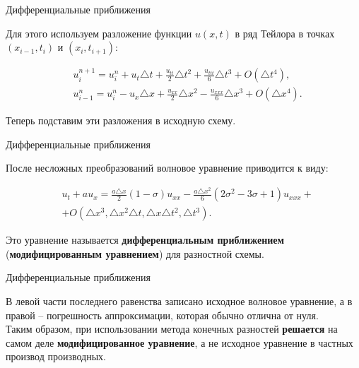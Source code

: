 \documentclass[10pt,xcolor=pst,aspectratio=169]{beamer}
\begin{document}
\begin{frame}{Дифференциальные приближения}

	\transdissolve[duration=0.1]
	\justifying
	\large

	Для   этого   используем   разложение функции $u(x,t)$ в ряд Тейлора в точках $(x_{i - 1}, t_{i})$ и $(x_{i}, t_{i + 1})$:

	\[
		\begin{split}
			&u^{n + 1}_{i} = u^{n}_{i} + u_{t} \triangle t + \frac{u_{tt}}{2} \triangle t^{2} + \frac{u_{ttt}}{6} \triangle t^{3} + O(\triangle t^{4}),\\
			&u^{n}_{i - 1} = u^{n}_{i} - u_{x} \triangle x + \frac{u_{xx}}{2} \triangle x^{2} - \frac{u_{xxx}}{6} \triangle x^{3} + O(\triangle x^{4}).
		\end{split}
	\]

	Теперь подставим эти разложения в исходную схему.\\

\end{frame}

\begin{frame}{Дифференциальные приближения}

	\transdissolve[duration=0.1]
	\justifying
	\large

	После несложных преобразований волновое уравнение приводится к виду:

	\[
		\begin{split}
			&u_{t} + a u_{x} = \frac{a \triangle x}{2} (1 - \sigma) u_{xx} - \frac{a \triangle x^{2}}{6} (2 \sigma^{2} - 3 \sigma + 1) u_{xxx} + \\
			& + O(\triangle x^{3}, \triangle x^{2} \triangle t, \triangle x \triangle t^{2}, \triangle t^{3}) .
		\end{split}
	\]

	Это уравнение называется \textbf{дифференциальным приближением} (\textbf{модифицированным уравнением}) для разностной схемы.\\

\end{frame}

\begin{frame}{Дифференциальные приближения}

	\transdissolve[duration=0.1]
	\justifying
	\large

	В левой части последнего равенства записано исходное волновое уравнение, а в правой -- погрешность аппроксимации, которая обычно отлична от нуля.\\

	Таким образом, при использовании метода конечных разностей \textbf{решается} на самом деле \textbf{модифицированное уравнение}, а не исходное уравнение в частных производ производных.\\

\end{frame}
\end{document}
